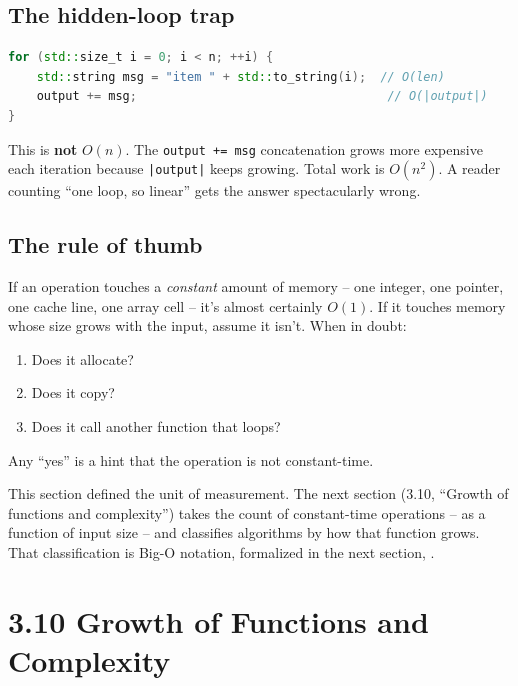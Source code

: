 \documentclass[11pt]{article}
\begin{document}
\subsection*{The hidden-loop trap}

\begin{warnbox}
\begin{lstlisting}[basicstyle=\ttfamily\small,frame=single,language=C++]
for (std::size_t i = 0; i < n; ++i) {
    std::string msg = "item " + std::to_string(i);  // O(len)
    output += msg;                                   // O(|output|)
}
\end{lstlisting}
This is \textbf{not} $O(n)$. The \texttt{output += msg} concatenation
grows more expensive each iteration because \texttt{|output|} keeps
growing. Total work is $O(n^2)$. A reader counting ``one loop, so
linear'' gets the answer spectacularly wrong.
\end{warnbox}

\subsection{The rule of thumb}

\begin{ideabox}
If an operation touches a \emph{constant} amount of memory -- one
integer, one pointer, one cache line, one array cell -- it's almost
certainly $O(1)$. If it touches memory whose size grows with the
input, assume it isn't. When in doubt:
\begin{enumerate}[leftmargin=*]
  \item Does it allocate?
  \item Does it copy?
  \item Does it call another function that loops?
\end{enumerate}
Any ``yes'' is a hint that the operation is not constant-time.
\end{ideabox}

\begin{notebox}
This section defined the unit of measurement. The next section
(3.10, ``Growth of functions and complexity'') takes the count of
constant-time operations -- as a function of input size -- and
classifies algorithms by how that function grows. That classification
is Big-O notation, formalized in the next section, .
\end{notebox}

\section{3.10 Growth of Functions and Complexity}
\end{document}

